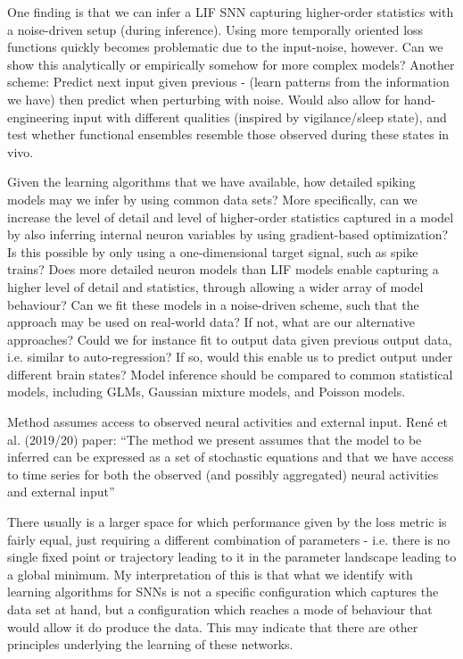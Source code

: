\documentclass[mphil,deptreport,ianc]{infthesis} %
\begin{document}
One finding is that we can infer a LIF SNN capturing higher-order statistics with a noise-driven setup (during inference). Using more temporally oriented loss functions quickly becomes problematic due to the input-noise, however. Can we show this analytically or empirically somehow for more complex models?
Another scheme: Predict next input given previous - (learn patterns from the information we have) then predict when perturbing with noise. Would also allow for hand-engineering input with different qualities (inspired by vigilance/sleep state), and test whether functional ensembles resemble those observed during these states in vivo.

Given the learning algorithms that we have available, how detailed spiking models may we infer by using common data sets? More specifically, can we increase the level of detail and level of higher-order statistics captured in a model by also inferring internal neuron variables by using gradient-based optimization? Is this possible by only using a one-dimensional target signal, such as spike trains? Does more detailed neuron models than LIF models enable capturing a higher level of detail and statistics, through allowing a wider array of model behaviour? Can we fit these models in a noise-driven scheme, such that the approach may be used on real-world data? If not, what are our alternative approaches? Could we for instance fit to output data given previous output data, i.e. similar to auto-regression? If so, would this enable us to predict output under different brain states?
Model inference should be compared to common statistical models, including GLMs, Gaussian mixture models, and Poisson models.


Method assumes access to observed neural activities and external input.
René et al. (2019/20) paper:
“The method we present assumes that the model to be inferred can be expressed as a
set of stochastic equations and that we have access to time series for both the observed (and possibly aggregated) neural activities and external input”

There usually is a larger space for which performance given by the loss metric is fairly equal, just requiring a different combination of parameters - i.e. there is no single fixed point or trajectory leading to it in the parameter landscape leading to a global minimum.
My interpretation of this is that what we identify with learning algorithms for SNNs is not a specific configuration which captures the data set at hand, but a configuration which reaches a mode of behaviour that would allow it do produce the data.
This may indicate that there are other principles underlying the learning of these networks.
\end{document}
